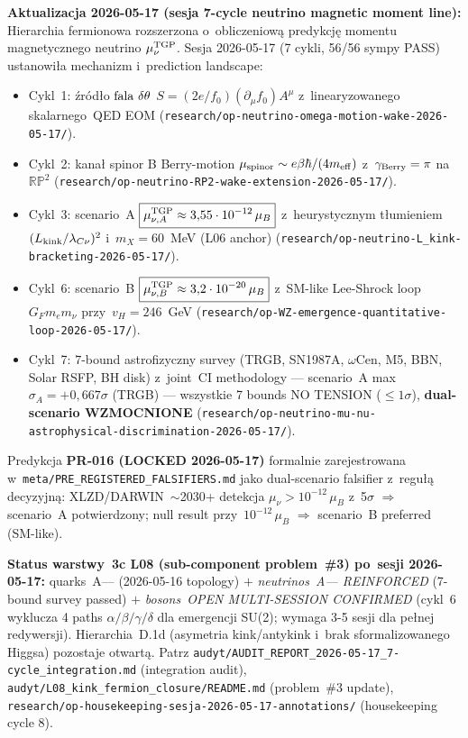 \begin{remark}
\textbf{Aktualizacja 2026-05-17 (sesja 7-cycle neutrino magnetic moment line):}
Hierarchia fermionowa rozszerzona o~obliczeniow\k{a} predykcj\k{e} momentu magnetycznego
neutrino $\mu_\nu^{\rm TGP}$. Sesja 2026-05-17 (7 cykli, 56/56 sympy PASS) ustanowi\l{}a
mechanizm i~prediction landscape:
\begin{itemize}\itemsep0pt
  \item Cykl~1: \'zr\'od\l{}o ${\rm fala}~\delta\theta$
    $S = (2e/f_0)(\partial_\mu f_0) A^\mu$ z~linearyzowanego skalarnego~QED EOM
    (\texttt{research/op-neutrino-omega-motion-wake-2026-05-17/}).
  \item Cykl~2: kana\l{} spinor B Berry-motion $\mu_{\rm spinor}\sim e\beta\hbar/(4m_{\rm eff})$
    z~$\gamma_{\rm Berry}=\pi$ na~$\mathbb{RP}^2$
    (\texttt{research/op-neutrino-RP2-wake-extension-2026-05-17/}).
  \item Cykl~3: scenario~A $\boxed{\mu_{\nu,A}^{\rm TGP} \approx 3{,}55\cdot 10^{-12}\,\mu_B}$
    z~heurystycznym t\l{}umieniem $(L_{\rm kink}/\lambda_{C\nu})^2$ i~$m_X=60$~MeV (L06 anchor)
    (\texttt{research/op-neutrino-L\_kink-bracketing-2026-05-17/}).
  \item Cykl~6: scenario~B $\boxed{\mu_{\nu,B}^{\rm TGP} \approx 3{,}2\cdot 10^{-20}\,\mu_B}$
    z~SM-like Lee-Shrock loop $G_F m_e m_\nu$ przy~$v_H=246$~GeV
    (\texttt{research/op-WZ-emergence-quantitative-loop-2026-05-17/}).
  \item Cykl~7: $7$-bound astrofizyczny survey (TRGB, SN1987A, $\omega$Cen, M5, BBN, Solar RSFP, BH disk)
    z~joint~CI methodology --- scenario~A max~$\sigma_A=+0{,}667\sigma$ (TRGB) ---
    wszystkie 7 bounds NO TENSION ($\le 1\sigma$), \textbf{dual-scenario WZMOCNIONE}
    (\texttt{research/op-neutrino-mu-nu-astrophysical-discrimination-2026-05-17/}).
\end{itemize}
Predykcja \textbf{PR-016 (LOCKED 2026-05-17)} formalnie zarejestrowana w~\texttt{meta/PRE\_REGISTERED\_FALSIFIERS.md}
jako dual-scenario falsifier z~regu\l{}\k{a} decyzyjn\k{a}: XLZD/DARWIN~$\sim$2030+ detekcja
$\mu_\nu>10^{-12}\,\mu_B$ z~5$\sigma$ $\Rightarrow$ scenario~A potwierdzony; null result
przy~$10^{-12}\,\mu_B$ $\Rightarrow$ scenario~B preferred (SM-like).

\textbf{Status warstwy~3c L08 (sub-component problem~\#3) po~sesji 2026-05-17:}
quarks~A--- (2026-05-16 topology) $+$ \emph{neutrinos~A--- REINFORCED} (7-bound survey passed)
$+$ \emph{bosons~OPEN MULTI-SESSION CONFIRMED} (cykl~6 wyklucza 4 paths $\alpha/\beta/\gamma/\delta$
dla emergencji SU(2); wymaga 3-5 sesji dla pe\l{}nej redywersji). Hierarchia~D.1d
(asymetria kink/antykink i~brak sformalizowanego Higgsa) pozostaje otwart\k{a}.
Patrz \texttt{audyt/AUDIT\_REPORT\_2026-05-17\_7-cycle\_integration.md} (integration audit),
\texttt{audyt/L08\_kink\_fermion\_closure/README.md} (problem~\#3 update),
\texttt{research/op-housekeeping-sesja-2026-05-17-annotations/} (housekeeping cycle 8).
\end{remark}

